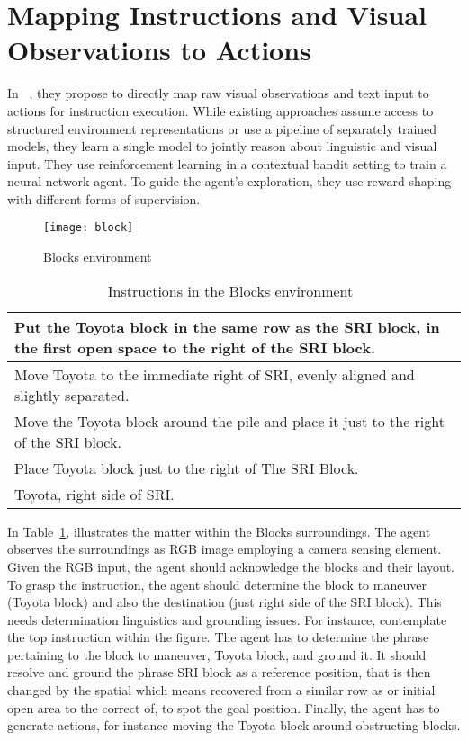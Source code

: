 \section{Mapping Instructions and Visual Observations to Actions}
In ~\cite{DBLP:journals/corr/MisraLA17}, they propose to directly map raw visual observations and text input to actions for instruction execution.  While existing approaches assume access to structured environment representations or use a pipeline of separately trained models, they learn a single model to jointly reason about linguistic and visual input. They use reinforcement learning in a contextual bandit setting to train a neural network agent. To guide the agent’s exploration, they use reward shaping with different forms of supervision.

\begin{figure}[htbp]
    \centering
    \texttt{[image: block]}
    \caption{Blocks environment~\cite{DBLP:journals/corr/MisraLA17}}
\end{figure}
\newpage
\begin{table}[h!]
    \begin{tabular}{|p{15cm}|}
    \hline
    Put the Toyota block in the same row as the SRI block, in the first open space to the right of the SRI block.\\
    \hline
    Move Toyota to the immediate right of SRI, evenly aligned and slightly separated.\\
    \hline
    Move the Toyota block around the pile and place it just to the right of the SRI block.\\
    \hline
    Place Toyota block just to the right of The SRI Block.\\
    \hline
    Toyota, right side of SRI.\\
    \hline
    \end{tabular}
    \caption{Instructions in the Blocks environment~\cite{DBLP:journals/corr/MisraLA17}}
    \label{tab:1}
\end{table}

In Table~\ref{tab:1}, illustrates the matter within the Blocks surroundings. The agent observes the surroundings as RGB image employing a camera sensing element. Given the RGB input, the agent should acknowledge the blocks and their layout. To grasp the instruction, the agent should determine the block to maneuver (Toyota block) and also the destination (just right side of the SRI block). This needs determination linguistics and grounding issues. For instance, contemplate the top instruction within the figure. The agent has to determine the phrase pertaining to the block to maneuver, Toyota block, and ground it. It should resolve and ground the phrase SRI block as a reference position, that is then changed by the spatial which means recovered from a similar row as or initial open area to the correct of, to spot the goal position. Finally, the agent has to generate actions, for instance moving the Toyota block around obstructing blocks.

